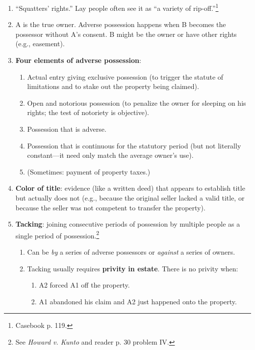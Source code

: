 \begin{enumerate}
    \item ``Squatters' rights.'' Lay people often see it as ``a variety of 
    rip-off.''\footnote{Casebook p. 119.}
    \item A is the true owner. Adverse possession happens when B becomes the 
    possessor without A's consent. B might be the owner or have other rights 
    (e.g., easement).
    \item \textbf{Four elements of adverse possession}:
    \begin{enumerate}
        \item Actual entry giving exclusive possession (to trigger the statute 
        of limitations and to stake out the property being claimed).
        \item Open and notorious possession (to penalize the owner for 
        sleeping on his rights; the test of notoriety is objective).
        \item Possession that is adverse.
        \item Possession that is continuous for the statutory period (but not 
        literally constant---it need only match the average owner's use).
        \item (Sometimes: payment of property taxes.)
    \end{enumerate}
    \item \textbf{Color of title}: evidence (like a written deed) that appears 
    to establish title but actually does not (e.g., because the original 
    seller lacked a valid title, or because the seller was not competent to 
    transfer the property).
    \item \textbf{Tacking}: joining consecutive periods of possession by 
    multiple people as a single period of possession.\footnote{See 
    \emph{Howard v. Kunto} and reader p. 30 problem IV.}
    \begin{enumerate}
        \item Can be \emph{by} a series of adverse possessors or \emph{against} 
        a series of owners.
        \item Tacking usually requires \textbf{privity in estate}. There is no 
        privity when:
        \begin{enumerate}
            \item A2 forced A1 off the property.
            \item A1 abandoned his claim and A2 just happened onto the 
            property.
        \end{enumerate}

\end{enumerate}
\end{enumerate}
